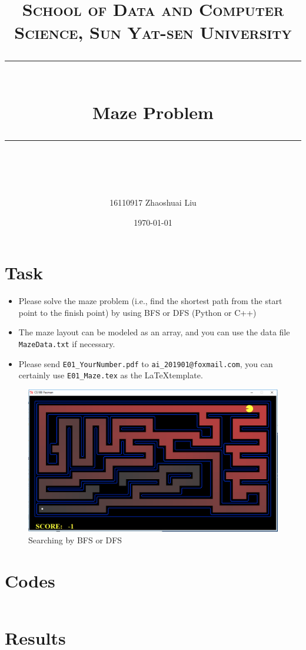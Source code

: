 \documentclass[a4paper, 11pt]{article}
\title{	
\normalfont \normalsize
\textsc{School of Data and Computer Science, Sun Yat-sen University} \\ [25pt] %
\rule{\textwidth}{0.5pt} \\[0.4cm] %
\huge  Maze Problem\\ %
\rule{\textwidth}{2pt} \\[0.5cm] %
\author{16110917 Zhaoshuai Liu}
\date{\normalsize\today}
}
\begin{document}
\maketitle
\tableofcontents
\newpage
\section{Task}



\begin{itemize}
	\item Please solve the maze problem (i.e., find the shortest path from the start point to the finish point) by using BFS or DFS (Python or C++)
	\item The maze layout can be modeled as an array, and you can use the data file \texttt{MazeData.txt} if necessary.
	\item Please send \texttt{E01\_YourNumber.pdf} to \texttt{ai\_201901@foxmail.com}, you can certainly use \texttt{E01\_Maze.tex} as the \LaTeX template.
\end{itemize}

\begin{figure}[ht]
\centering
\includegraphics[width=15cm]{Pic/Pacman}

\caption{Searching by BFS or DFS}
\end{figure}
\section{Codes}
\lstset{language=C++}
\begin{lstlisting}

\end{lstlisting}
\section{Results}
\begin{figure}
\centering
\end{figure}


%
%
\end{document}
